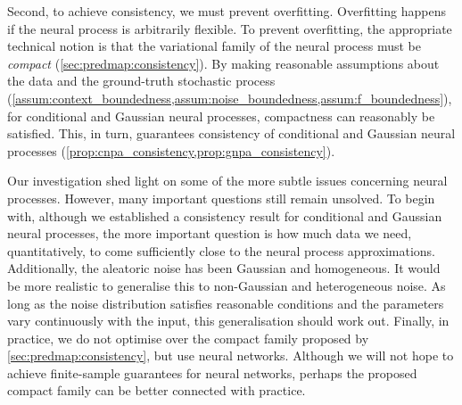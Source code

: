 \documentclass[12pt, twoside]{report}
\begin{document}
Second, to achieve consistency, we must prevent overfitting.
Overfitting happens if the neural process is arbitrarily flexible.
To prevent overfitting, the appropriate technical notion is that the variational family of the neural process must be \emph{compact} (\cref{sec:predmap:consistency}).
By making reasonable assumptions about the data and the ground-truth stochastic process (\cref{assum:context_boundedness,assum:noise_boundedness,assum:f_boundedness}), for conditional and Gaussian neural processes, compactness can reasonably be satisfied.
This, in turn, guarantees consistency of conditional and Gaussian neural processes (\cref{prop:cnpa_consistency,prop:gnpa_consistency}).

Our investigation shed light on some of the more subtle issues concerning neural processes.
However, many important questions still remain unsolved.
To begin with, although we established a consistency result for conditional and Gaussian neural processes, the more important question is how much data we need, quantitatively, to come sufficiently close to the neural process approximations.
Additionally,
the aleatoric noise has been Gaussian and homogeneous.
It would be more realistic to generalise this to non-Gaussian and heterogeneous noise.
As long as the noise distribution satisfies reasonable conditions and the parameters vary continuously with the input, this generalisation should work out.
Finally, in practice, we do not optimise over the compact family proposed by \cref{sec:predmap:consistency}, but use neural networks.
Although we will not hope to achieve finite-sample guarantees for neural networks, perhaps the proposed compact family can be better connected with practice.
\end{document}

